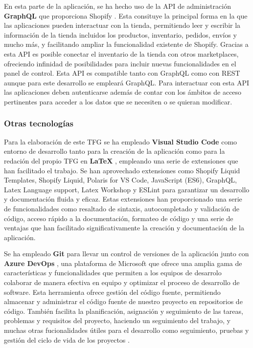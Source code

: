 \documentclass[12pt]{article}
\begin{document}
En esta parte de la aplicación, se ha hecho uso de la API de administración \textbf{GraphQL} que proporciona Shopify \cite{api-administracion-graphql}. Esta consituye la principal forma en la que 
las aplicaciones pueden interactuar con la tienda, permitiendo leer y escribir la información de la tienda incluidos los productos, inventario, pedidos,
envíos y mucho más, y facilitando ampliar la funcionalidad existente de Shopify. Gracias a esta API es posible conectar el inventario
de la tienda con otros marketplaces, ofreciendo infinidad de posibilidades para incluir nuevas funcionalidades en el panel de control.
Esta API es compatible tanto con GraphQL como con REST aunque para este desarrollo se empleará GraphQL. Para interactuar con esta API las aplicaciones
deben autenticarse además de contar con los ámbitos de acceso pertinentes para acceder a los datos que se necesiten o se quieran modificar. \cite{shopify-dev}


\subsubsection{Otras tecnologías}
Para la elaboración de este TFG se ha empleado \textbf{Visual Studio Code} \cite{vsc} como entorno de desarrollo tanto para la creación de la aplicación como para
la redación del propio TFG en \textbf{LaTeX} \cite{latex}, empleando una serie de extensiones que han facilitado el trabajo. 
Se han aprovechado extensiones como Shopify Liquid Templates, Shopify Liquid, 
Polaris for VS Code, JavaScript (ES6), GraphQL, Latex Language support, Latex Workshop y ESLint para garantizar un desarrollo y documentación
fluida y eficaz. Estas extensiones han proporcionado una serie de funcionalidades como resaltado de sintaxis, autocompletado y validación de código, 
acceso rápido a la documentación, formateo de código y una serie de ventajas que han facilitado significativamente la creación y documentación de la aplicación.

Se ha empleado \textbf{Git} \cite{git} para llevar un control de versiones de la aplicación junto con \textbf{Azure DevOps} \cite{azure-devops}, una plataforma de Microsoft que ofrece una amplia
gama de características y funcionalidades que permiten a los equipos de desarrolo colaborar de manera efectiva en equipo y optimizar el proceso de desarrollo
de software. Esta herramienta ofrece gestión del código fuente, permitiendo almacenar y administrar el código fuente de nuestro proyecto en 
repositorios de código. También facilita la planificación, asignación y seguimiento de las tareas, problemas y requisitos del proyecto, haciendo
un seguimiento del trabajo, y muchas otras fucionalidades útiles para el desarrollo como seguimiento, pruebas y gestión del ciclo de vida de los proyectos \cite{devOps}. 
\end{document}
